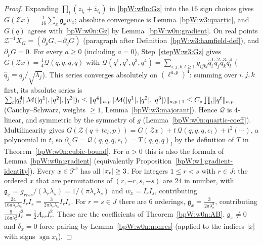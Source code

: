 \begin{proof}
\label{stepW:w3:Gz}
Expanding $\prod_t(z_{i_t}+\bar z_{i_t})$ in \eqref{bpW:w0n:Gz} into the $16$ sign choices gives
$G(\mathcal Zx)=\frac1{16}\sum_x\mathfrak g_xw_x$; absolute convergence is Lemma~\ref{bpW:w3:quartic}, and
$G(q)$ agrees with \eqref{bpW:w0n:Gz} by Lemma~\ref{bpW:w0n:gradient}.
\label{stepW:w3:XG}
On real points $\mathcal Z^{-1}X_G=(\partial_pG,-\partial_qG)$ (paragraph after
Definition~\ref{bpW:w3:hamfield-def}), and $\partial_pG=0$. For every $a\ge0$ (including $a=0$),
Step~\ref{stepW:w3:Gz} gives $G(\mathcal Zx)=\frac14\mathcal Q(q,q,q,q)$ with
$\mathcal Q(q^1,q^2,q^3,q^4)=\sum_{i,j,k,l\ge1}g_{ijkl}\hat q^1_i\hat q^2_j\hat q^3_k\hat q^4_l$
($\hat q_j=q_j/\sqrt{\lambda_j}$). This series converges absolutely on $(\ell^{a,p})^4$: summing over $i,j,k$ first,
its absolute series is $\sum_l\lvert q^4_l\rvert\,\mathcal M(\lvert q^1\rvert,\lvert q^2\rvert,\lvert q^3\rvert)_l\le\lVert q^4\rVert_{a,p}
\lVert \mathcal M(\lvert q^1\rvert,\lvert q^2\rvert,\lvert q^3\rvert)\rVert_{a,p+1}\le C_*\prod_t\lVert q^t\rVert_{a,p}$ (Cauchy--Schwarz, weights
$\ge1$, Lemma~\ref{bpW:w3:majorant}). Hence $\mathcal Q$ is $4$-linear, and symmetric by the symmetry of $g$
(Lemma~\ref{bpW:w0n:quartic-coeff}). Multilinearity gives
$G(\mathcal Z(q+te_l,p))=G(\mathcal Zx)+t\,\mathcal Q(q,q,q,e_l)+t^2(\cdots)$, a polynomial in $t$, so
$\partial_{q_l}G=\mathcal Q(q,q,q,e_l)=T(q,q,q)_l$ by the definition of $T$ in Theorem~\ref{bpW:w0n:cubic-bound}.
For $a>0$ this is also the formula of Lemma~\ref{bpW:w0n:gradient} (equivalently
Proposition~\ref{bpW:w1:gradient-identity}).
\label{stepW:w3:Gnor}
Every $x\in\mathcal T^c$ has all $\lvert x_t\rvert\ge3$.
\label{stepW:w3:count}
For integers $1\le r<s$ with $r\in J$: the ordered $x$ that are permutations of $(r,-r,s,-s)$ are $24$ in number, with $\mathfrak g_x=g_{rrss}/(\lambda_r\lambda_s)=1/(\pi\lambda_r\lambda_s)$
and $w_x=I_rI_s$, contributing $\frac{24}{16\pi\lambda_r\lambda_s}I_rI_s=\frac{3}{2\pi\lambda_r\lambda_s}I_rI_s$. For
$r=s\in J$ there are $6$ orderings, $\mathfrak g_x=\frac{3}{2\pi\lambda_r^2}$, contributing $\frac{9}{16\pi\lambda_r^2}I_r^2=\frac12A_{rr}I_r^2$.
These are the coefficients of Theorem~\ref{bpW:w0n:AB}.
\label{stepW:w3:res}
$\mathfrak g_x\ne0$ and $\delta_x=0$ force pairing by Lemma~\ref{bpW:w0n:nonres} (applied to the indices $\lvert x\rvert$
with signs $\operatorname{sgn}x_t$).
\end{proof}

